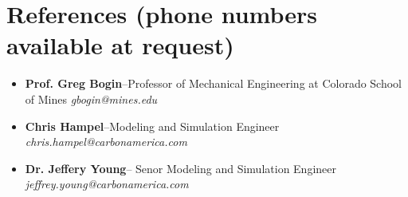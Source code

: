 \documentclass[5pt,a4paper,sans]{moderncv}
\begin{document}
	\section{References \tiny{(phone numbers available at request)}}
	
	\vspace{1pt}
	
	\begin{itemize}
		\item[]{\textbf{Prof. Greg Bogin}--Professor of Mechanical Engineering at Colorado School of Mines \hfill \textit{gbogin@mines.edu}}
		\item[]{\textbf{Chris Hampel}--Modeling and Simulation Engineer \hfill \textit{chris.hampel@carbonamerica.com}}
		\item[]{\textbf{Dr. Jeffery Young}-- Senor Modeling and Simulation Engineer \hfill \textit{jeffrey.young@carbonamerica.com}}
	\end{itemize}
	
%	
	
	
	
\end{document}
